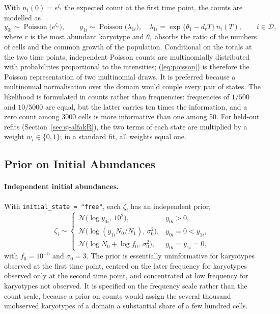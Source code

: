 \documentclass[11pt]{article}
\newcommand{\Normal}{\mathcal{N}}
\begin{document}
With $n_i(0)=e^{\zeta_i}$ the expected count at the first time point, the counts
are modelled as
\begin{equation}
  y_{0i}\sim\operatorname{Poisson}\bigl(e^{\zeta_i}\bigr),
  \qquad
  y_{1i}\sim\operatorname{Poisson}\bigl(\lambda_{1i}\bigr),
  \quad
  \lambda_{1i}=\exp\bigl\{\theta_1-d_rT\bigr\}\,n_i(T),
  \qquad i\in\mathcal{D},
  \label{eq:poisson}
\end{equation}
where $r$ is the most abundant karyotype and $\theta_1$ absorbs the ratio of
the numbers of cells and the common growth of the population. Conditional on the
totals at the two time points, independent Poisson counts are multinomially distributed with
probabilities proportional to the intensities; (\ref{eq:poisson}) is therefore
the Poisson representation of two multinomial draws. It is preferred
because a multinomial normalisation over the domain would couple every pair
of states. The likelihood is formulated in counts rather than frequencies:
frequencies of $1/500$ and $10/5000$ are equal, but the latter carries ten
times the information, and a zero count among 3000 cells is more informative
than one among 50. For held-out refits (Section~\ref{sec:sj-alfakR}), the two
terms of each state are multiplied by a weight $w_i\in\{0,1\}$; in a standard
fit, all weights equal one.

\subsection{Prior on Initial Abundances}
\label{sec:sj-initial}

\paragraph{Independent initial abundances.}
With \texttt{initial\_state = "free"}, each $\zeta_i$ has an independent
prior,
\begin{equation}
  \zeta_i\sim
  \begin{cases}
  \Normal\bigl(\log y_{0i},\,10^2\bigr), & y_{0i}>0,\\
  \Normal\bigl(\log(y_{1i}N_0/N_1),\,\sigma_0^2\bigr), & y_{0i}=0<y_{1i},\\
  \Normal\bigl(\log N_0+\log f_0,\,\sigma_0^2\bigr), & y_{0i}=y_{1i}=0,
  \end{cases}
  \label{eq:free-prior}
\end{equation}
with $f_0=10^{-5}$ and $\sigma_0=3$. The prior is essentially uninformative
for karyotypes observed at the first time point, centred on the later frequency
for karyotypes observed only at the second time point, and concentrated at low
frequency for karyotypes not observed. It is specified on the frequency scale
rather than the count scale, because a prior on counts would assign the
several thousand unobserved karyotypes of a domain a substantial share of a
few hundred cells.
\end{document}
